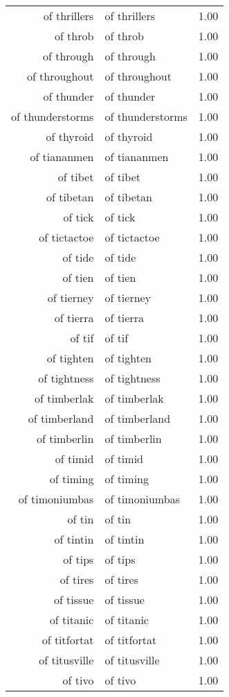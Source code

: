 \begin{table}[ht]
\begin{tabular}{rlr}
  of thrillers & of thrillers & 1.00 \\ 
  of throb & of throb & 1.00 \\ 
  of through & of through & 1.00 \\ 
  of throughout & of throughout & 1.00 \\ 
  of thunder & of thunder & 1.00 \\ 
  of thunderstorms & of thunderstorms & 1.00 \\ 
  of thyroid & of thyroid & 1.00 \\ 
  of tiananmen & of tiananmen & 1.00 \\ 
  of tibet & of tibet & 1.00 \\ 
  of tibetan & of tibetan & 1.00 \\ 
  of tick & of tick & 1.00 \\ 
  of tictactoe & of tictactoe & 1.00 \\ 
  of tide & of tide & 1.00 \\ 
  of tien & of tien & 1.00 \\ 
  of tierney & of tierney & 1.00 \\ 
  of tierra & of tierra & 1.00 \\ 
  of tif & of tif & 1.00 \\ 
  of tighten & of tighten & 1.00 \\ 
  of tightness & of tightness & 1.00 \\ 
  of timberlak & of timberlak & 1.00 \\ 
  of timberland & of timberland & 1.00 \\ 
  of timberlin & of timberlin & 1.00 \\ 
  of timid & of timid & 1.00 \\ 
  of timing & of timing & 1.00 \\ 
  of timoniumbas & of timoniumbas & 1.00 \\ 
  of tin & of tin & 1.00 \\ 
  of tintin & of tintin & 1.00 \\ 
  of tips & of tips & 1.00 \\ 
  of tires & of tires & 1.00 \\ 
  of tissue & of tissue & 1.00 \\ 
  of titanic & of titanic & 1.00 \\ 
  of titfortat & of titfortat & 1.00 \\ 
  of titusville & of titusville & 1.00 \\ 
  of tivo & of tivo & 1.00 \\ 

\end{tabular}
\end{table}
